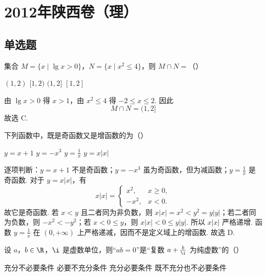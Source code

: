 \chapter{2012年陕西卷（理）}

\section{单选题}

\begin{problem}
集合 \(M = \{x \mid \lg x > 0\}\)，\(N = \{x \mid x^2 \leqslant 4\}\)，则 \(M \cap N =\)（\quad）

\choices
    {\((1,2)\)}
    {\([1,2)\)}
    {\((1,2]\)}
    {\([1,2]\)}
\end{problem}


\begin{solution}
由 \(\lg x>0\) 得 \(x>1\)，由 \(x^2\leqslant4\) 得 \(-2\leqslant x\leqslant2\). 因此
\[
M\cap N=(1,2]
\]
故选 C.
\end{solution}

\begin{problem}
下列函数中，既是奇函数又是增函数的为（\quad）

\choices
    {\(y = x + 1\)}
    {\( y = -x^3 \)}
    {\( y = \frac{1}{x} \)}
    {\(y = x|x|\)}
\end{problem}


\begin{solution}
逐项判断：\(y=x+1\) 不是奇函数；\(y=-x^3\) 虽为奇函数，但为减函数；\(y=\frac{1}{x}\) 是奇函数. 对于 \(y=x|x|\)，有
\[
x|x|=
\begin{cases}
x^2,&x\geqslant0,\\
-x^2,&x<0.
\end{cases}
\]
故它是奇函数. 若 \(x<y\) 且二者同为非负数，则 \(x|x|=x^2<y^2=y|y|\)；若二者同为负数，则 \(-x^2<-y^2\)；若 \(x<0\leqslant y\)，则 \(x|x|<0\leqslant y|y|\). 所以 \(x|x|\) 严格递增.
函数 \(y=\frac{1}{x}\) 在 \((0,+\infty)\) 上严格递减，因而不是定义域上的增函数. 故选 D.
\end{solution}

\begin{problem}
设 \(a\)，\(b\in\R\)，\(\i\) 是虚数单位，则“\(ab = 0\)”是“复数 \(a + \frac{b}{\i}\) 为纯虚数”的（\quad）

\choices
    {充分不必要条件}
    {必要不充分条件}
    {充分必要条件}
    {既不充分也不必要条件}
\end{problem}

